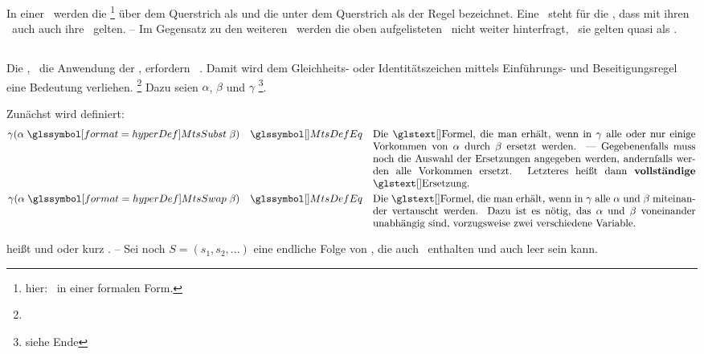 {In einer \Schlussregel\ werden die \Formeln%
\footnote{hier: \Aussagen\ in einer formalen Form.}
über dem Querstrich als  und die unter dem Querstrich als  der Regel bezeichnet.
Eine \Schlussregel\ steht für die \Aussage, dass mit ihren \Voraussetzungen\ auch auch ihre \Folgerungen\ gelten.
-- Im Gegensatz zu den weiteren \Schlussregeln\ werden die oben aufgelisteten \Basisregeln\ nicht weiter hinterfragt, \textdh\ sie gelten quasi als \Axiome.

\subsection[Identitätsregeln]{\Identitaetsregeln}%
\label                    {sub-Identitaetsregeln}

Die \zulaessigenUmwandlungen, \textdh\ die Anwendung der \Schlussregeln, erfordern \zulaessige\ \Ersetzungen.
Damit wird dem Gleichheits- oder Identitätszeichen \chrqt{\MtsEq} mittels Einführungs- und Beseitigungsregel eine Bedeutung verliehen.%
\footnote{}
Dazu seien $\alpha$, $\beta$ und $\gamma$ \vergleichbare\footnote{siehe Ende }\Formeln.

Zunächst wird definiert:
\begin{align}
	\gamma(\alpha \defSymBin{\MtsSubst} \beta) \quad \MtsDefEq \quad
	\parbox[t]{11cm}{%
		Die \Formel, die man erhält, wenn in $\gamma$ alle oder nur einige Vorkommen von $\alpha$ durch $\beta$ ersetzt werden.
		--- Gegebenenfalls muss noch die Auswahl der Ersetzungen angegeben werden, andernfalls werden alle Vorkommen ersetzt.
		Letzteres heißt dann \defFt{vollständige} \Ersetzung.
	} \label{def-ErsetzungAlt}\\
	\gamma(\alpha \defSymBin{\MtsSwap} \beta) \quad \MtsDefEq \quad
	\parbox[t]{11cm}{%
		Die \Formel, die man erhält, wenn in $\gamma$ alle $\alpha$ und $\beta$ miteinander vertauscht werden.
		Dazu ist es nötig, das $\alpha$ und $\beta$ voneinander unabhängig sind, vorzugsweise zwei verschiedene Variable.
	} \label{def-Vertauschung}
\end{align}

\seqqt{$ \alpha \MtsSubst \beta $} heißt  und \seqqt{$ \alpha \MtsSwap \beta $}  oder kurz .
-- Sei noch $S = (s_1, s_2, ...)$ eine endliche Folge von \Ersetzungen, die auch \Vertauschungen\ enthalten und auch leer sein kann.

}
